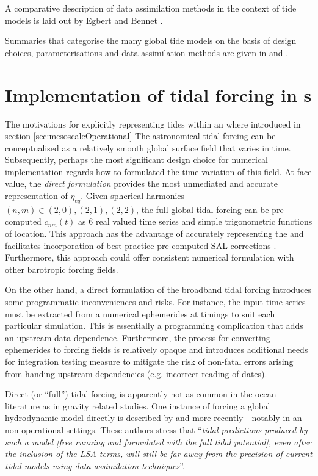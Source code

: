 A comparative description of data assimilation methods in the context of tide models is laid out by Egbert and Bennet \cite{Egbert:1996vr}.


Summaries that categorise the many global tide models on the basis of design choices, parameterisations and data assimilation methods are given in \cite{Ardalan:2008gs} and \cite{Matsumoto:2000tg}. 
\section{Implementation of tidal forcing in \OGCM{}s }
The motivations for explicitly representing tides within an \OGCM{} where introduced in section \ref{sec:mesoscaleOperational}
The astronomical tidal forcing can be conceptualised as a relatively smooth global surface field that varies in time. 
Subsequently, perhaps the most significant design choice for numerical implementation regards how to formulated the time variation of this field.
At face value, the \emph{direct formulation} provides the most unmediated and accurate representation of $\eta_{eq}$. Given spherical harmonics $(n,m) \in (2,0) , (2,1) , (2,2)$, the full global tidal forcing can be pre-computed $c_{nm}(t)$ as 6 real valued time series and simple trigonometric functions of location.
This approach has the advantage of accurately representing the \ATGP{} and facilitates incorporation of best-practice pre-computed SAL corrections \citep{Egbert:2002ug}. 
Furthermore, this approach could offer consistent numerical formulation with other barotropic forcing fields.


On the other hand, a direct formulation of the broadband tidal forcing introduces some programmatic inconveniences and risks. 
For instance, the input time series must be extracted from a numerical ephemerides at timings to suit each particular simulation.  This is essentially a programming complication that adds an upstream data dependence.
Furthermore, the process for converting ephemerides to forcing fields is relatively opaque and introduces additional needs for integration testing measure to mitigate the risk of non-fatal errors arising from handing upstream dependencies (e.g. incorrect reading of dates).

Direct (or ``full'') tidal forcing is apparently not as common in the ocean literature as in gravity related studies. One instance of forcing a global hydrodynamic model directly is described by \cite{Weis:2008ex} and more recently \cite{Logemann:2020} - notably in an non-operational settings.   These authors stress that ``\textit{tidal predictions produced by such a model [free running and formulated with the full tidal potential], even after the inclusion of the LSA terms, will still be far away from the precision of current tidal models using data assimilation techniques}''.

